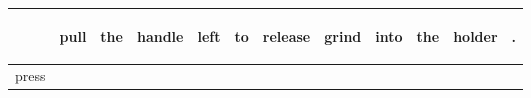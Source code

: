 \documentclass[landscape]{article}
\newcommand{\ssp}{\hspace{2pt}}
\begin{document}
\noindent\begin{tabular}{|l|p{10pt}|p{10pt}|p{10pt}|p{10pt}|p{10pt}|p{10pt}|p{10pt}|p{10pt}|p{10pt}|p{10pt}|p{10pt}|}
\hline
&\begin{sideways}\cellcolor{ref0}pull\hspace{12pt}\end{sideways}&\begin{sideways}\cellcolor{ref1}the\hspace{12pt}\end{sideways}&\begin{sideways}\cellcolor{ref2}handle\hspace{12pt}\end{sideways}&\begin{sideways}\cellcolor{ref3}left\hspace{12pt}\end{sideways}&\begin{sideways}\cellcolor{ref4}to\hspace{12pt}\end{sideways}&\begin{sideways}\cellcolor{ref5}release\hspace{12pt}\end{sideways}&\begin{sideways}\cellcolor{ref6}grind\hspace{12pt}\end{sideways}&\begin{sideways}\cellcolor{ref7}into\hspace{12pt}\end{sideways}&\begin{sideways}\cellcolor{ref8}the\hspace{12pt}\end{sideways}&\begin{sideways}\cellcolor{ref9}holder\hspace{12pt}\end{sideways}&\begin{sideways}\cellcolor{ref10}.\hspace{12pt}\end{sideways}\\
\hline
\ssp press \ssp&\hspace{2pt}&\hspace{2pt}&\hspace{2pt}&\hspace{2pt}&\hspace{2pt}&\hspace{2pt}&\hspace{2pt}&\hspace{2pt}&\hspace{2pt}&\hspace{2pt}&\hspace{2pt}\\

\end{tabular}
\end{document}
